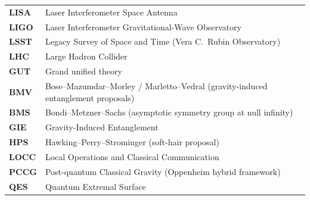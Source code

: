 \documentclass[11pt,a4paper]{article}
\begin{document}
\begin{longtable}{@{}p{2.6cm}p{12.6cm}@{}}
\textbf{LISA} & Laser Interferometer Space Antenna \\
\textbf{LIGO} & Laser Interferometer Gravitational-Wave Observatory \\
\textbf{LSST} & Legacy Survey of Space and Time (Vera C.~Rubin Observatory) \\
\textbf{LHC} & Large Hadron Collider \\
\textbf{GUT} & Grand unified theory \\
\textbf{BMV} & Bose--Mazumdar--Morley / Marletto--Vedral (gravity-induced entanglement proposals)~\cite{Bose_Mazumdar_Morley_2017,Marletto_Vedral_2017_GIE} \\
\textbf{BMS} & Bondi--Metzner--Sachs (asymptotic symmetry group at null infinity) \\
\textbf{GIE} & Gravity-Induced Entanglement \\
\textbf{HPS} & Hawking--Perry--Strominger (soft-hair proposal) \\
\textbf{LOCC} & Local Operations and Classical Communication \\
\textbf{PCCG} & Post-quantum Classical Gravity (Oppenheim hybrid framework) \\
\textbf{QES} & Quantum Extremal Surface \\
\end{longtable}
\end{document}
